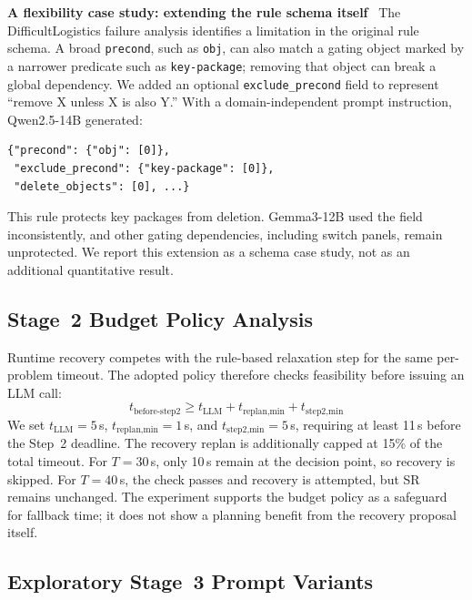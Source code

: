 \documentclass{ieeeaccess}
\newcommand{\myparagraph}[1]{\noindent\textbf{#1}~}
\begin{document}
\myparagraph{A flexibility case study: extending the rule schema itself}
\label{sec:exclude_precond}
The DifficultLogistics failure analysis identifies a limitation in the original rule schema. A broad \texttt{precond}, such as \texttt{obj}, can also match a gating object marked by a narrower predicate such as \texttt{key-package}; removing that object can break a global dependency.
We added an optional \texttt{exclude\_precond} field to represent ``remove X unless X is also Y.'' With a domain-independent prompt instruction, Qwen2.5-14B generated:
\begin{small}
\begin{verbatim}
{"precond": {"obj": [0]},
 "exclude_precond": {"key-package": [0]},
 "delete_objects": [0], ...}
\end{verbatim}
\end{small}
This rule protects key packages from deletion. Gemma3-12B used the field inconsistently, and other gating dependencies, including switch panels, remain unprotected. We report this extension as a schema case study, not as an additional quantitative result.



\subsection{Stage~2 Budget Policy Analysis}
\label{app:budget}

Runtime recovery competes with the rule-based relaxation step for the same per-problem timeout. The adopted policy therefore checks feasibility before issuing an LLM call:
\begin{equation}
  t_\text{before-step2} \geq t_\text{LLM} + t_\text{replan,min} + t_\text{step2,min}
\end{equation}
We set $t_\text{LLM}=5$\,s, $t_\text{replan,min}=1$\,s, and $t_\text{step2,min}=5$\,s, requiring at least 11\,s before the Step~2 deadline. The recovery replan is additionally capped at 15\% of the total timeout.
For $T{=}30$\,s, only 10\,s remain at the decision point, so recovery is skipped. For $T{=}40$\,s, the check passes and recovery is attempted, but SR remains unchanged.
The experiment supports the budget policy as a safeguard for fallback time; it does not show a planning benefit from the recovery proposal itself.


\subsection{Exploratory Stage~3 Prompt Variants}
\label{app:stage3_improvements}
\end{document}
